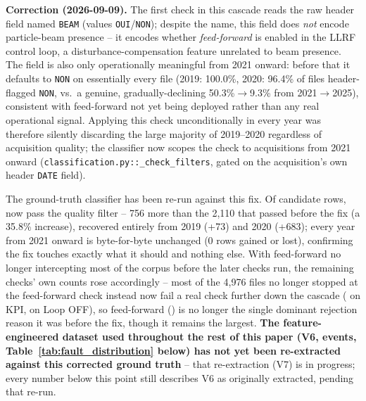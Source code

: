\textbf{Correction (2026-09-09).} The first check in this cascade reads the raw header field named \texttt{BEAM} (values \texttt{OUI}/\texttt{NON}); despite the name, this field does \emph{not} encode particle-beam presence -- it encodes whether \emph{feed-forward} is enabled in the LLRF control loop, a disturbance-compensation feature unrelated to beam presence. The field is also only operationally meaningful from 2021 onward: before that it defaults to \texttt{NON} on essentially every file (2019: 100.0\%, 2020: 96.4\% of files header-flagged \texttt{NON}, vs.\ a genuine, gradually-declining 50.3\%$\to$9.3\% from 2021$\to$2025), consistent with feed-forward not yet being deployed rather than any real operational signal. Applying this check unconditionally in every year was therefore silently discarding the large majority of 2019--2020 regardless of acquisition quality; the classifier now scopes the check to acquisitions from 2021 onward (\texttt{classification.py::\_check\_filters}, gated on the acquisition's own header \texttt{DATE} field). %

The ground-truth classifier has been re-run against this fix. Of \MetricZeroZeroDataAttritionChainGroundTruthRows{} candidate rows, \MetricZeroZeroDataAttritionChainGtPassing{} now pass the quality filter -- 756 more than the 2,110 that passed before the fix (a 35.8\% increase), recovered entirely from 2019 (+73) and 2020 (+683); every year from 2021 onward is byte-for-byte unchanged (0 rows gained or lost), confirming the fix touches exactly what it should and nothing else. %
With feed-forward no longer intercepting most of the corpus before the later checks run, the remaining checks' own counts rose accordingly -- most of the 4,976 files %
no longer stopped at the feed-forward check instead now fail a real check further down the cascade (\MetricZeroZeroDataAttritionChainFiltreReasonKpiOneZeroZero{} on KPI, \MetricZeroZeroDataAttritionChainFiltreReasonLoopOff{} on Loop OFF), so feed-forward (\MetricZeroZeroDataAttritionChainFiltreReasonFeedForwardNon{}) is no longer the single dominant rejection reason it was before the fix, though it remains the largest.
\textbf{The feature-engineered dataset used throughout the rest of this paper (V6, \MetricZeroZeroDataAttritionChainVSixTotalEvents{} events, Table~\ref{tab:fault_distribution} below) has not yet been re-extracted against this corrected ground truth} -- that re-extraction (V7) is in progress; every number below this point still describes V6 as originally extracted, pending that re-run.

